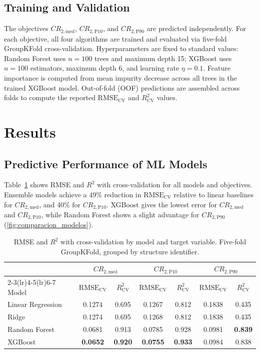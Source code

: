 \documentclass[preprint,12pt,authoryear]{elsarticle}
\newcommand{\CR}[1]{CR_{2,\text{#1}}}
\newcommand{\RMSE}{\mathrm{RMSE_{CV}}}       %
\newcommand{\Rsq}{R^{2}_{\mathrm{CV}}}
\begin{document}
\subsection{Training and Validation}
\label{sec:method:entrenamiento}

The objectives $\CR{med}$, $\CR{P10}$, and $\CR{P90}$ are predicted independently.
For each objective, all four algorithms are trained and evaluated via five-fold
GroupKFold cross-validation. Hyperparameters are fixed to standard values: Random
Forest uses $n=100$ trees and maximum depth 15; XGBoost uses $n=100$ estimators,
maximum depth 6, and learning rate $\eta=0.1$. Feature importance is computed from
mean impurity decrease across all trees in the trained XGBoost model. Out-of-fold
(OOF) predictions are assembled across folds to compute the reported $\RMSE$ and
$\Rsq$ values.

\section{Results}
\label{sec:results}

\subsection{Predictive Performance of ML Models}
\label{sec:results:desempenio}

Table~\ref{tab:desempenio} shows RMSE and $R^2$ with cross-validation for all models
and objectives. Ensemble models achieve a 49\% reduction in $\RMSE$ relative to linear
baselines for $\CR{med}$, and 40\% for $\CR{P10}$. XGBoost gives the lowest error for
$\CR{med}$ and $\CR{P10}$, while Random Forest shows a slight advantage for $\CR{P90}$
(\cref{fig:comparacion_modelos}).

\begin{table}[h!]
\centering
\caption{RMSE and $R^2$ with cross-validation by model and target variable.
         Five-fold GroupKFold, grouped by structure identifier.}
\label{tab:desempenio}
\small
\setlength{\tabcolsep}{4pt}
\begin{tabular}{lcccccc}
\toprule
& \multicolumn{2}{c}{$\CR{med}$}
& \multicolumn{2}{c}{$\CR{P10}$}
& \multicolumn{2}{c}{$\CR{P90}$} \\
\cmidrule(lr){2-3}\cmidrule(lr){4-5}\cmidrule(lr){6-7}
Model & $\RMSE$ & $\Rsq$ & $\RMSE$ & $\Rsq$ & $\RMSE$ & $\Rsq$ \\
\midrule
Linear Regression & 0.1274 & 0.695 & 0.1267 & 0.812 & 0.1838 & 0.435 \\
Ridge            & 0.1274 & 0.695 & 0.1268 & 0.812 & 0.1838 & 0.435 \\
Random Forest    & 0.0681 & 0.913 & 0.0785 & 0.928 & 0.0981 & \textbf{0.839} \\
XGBoost          & \textbf{0.0652} & \textbf{0.920} & \textbf{0.0755} & \textbf{0.933} & 0.0984 & 0.838 \\
\bottomrule
\end{tabular}
\end{table}
\end{document}
